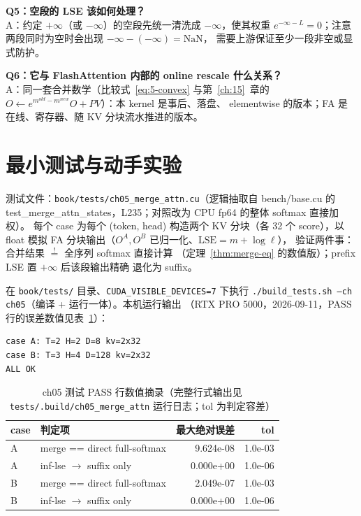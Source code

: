 \textbf{Q5：空段的 LSE 该如何处理？}\\
A：约定 $+\infty$（或 $-\infty$）的空段先统一清洗成 $-\infty$，使其权重
$e^{-\infty - L} = 0$；注意两段同时为空时会出现 $-\infty - (-\infty) = \mathrm{NaN}$，
需要上游保证至少一段非空或显式防护。

\textbf{Q6：它与 FlashAttention 内部的 online rescale 什么关系？}\\
A：同一套合并数学（比较式~\ref{eq:5-convex} 与第~\ref{ch:15}~章的
$O \leftarrow e^{m^{old} - m^{new}} O + PV$）：本 kernel 是事后、落盘、
elementwise 的版本；FA 是在线、寄存器、随 KV 分块流水推进的版本。

\section{最小测试与动手实验}

测试文件：\texttt{book/\allowbreak{}tests/\allowbreak{}ch05\_\allowbreak{}merge\_\allowbreak{}attn.cu}（逻辑抽取自 bench/base.cu 的
test\_merge\_attn\_states，L235；对照改为 CPU fp64 的整体 softmax 直接加权）。
每个 case 为每个 (token, head) 构造两个 KV 分块（各 32 个 score），以 float 模拟
FA 分块输出（$O^{A}, O^{B}$ 已归一化、$\mathrm{LSE} = m + \log \ell$），
验证两件事：合并结果 $\stackrel{!}{=}$ 全序列 softmax 直接计算
（定理~\ref{thm:merge-eq} 的数值版）；prefix LSE 置 $+\infty$ 后该段输出精确
退化为 suffix。

在 \texttt{book/tests/} 目录、\texttt{CUDA\_\allowbreak{}VISIBLE\_\allowbreak{}DEVICES=\allowbreak{}7} 下执行
\texttt{.\allowbreak{}/\allowbreak{}build\_\allowbreak{}tests.\allowbreak{}sh --ch ch05}（编译 + 运行一体）。本机运行输出
（RTX PRO 5000，2026-09-11，PASS 行的误差数值见表~\ref{tab:5-pass}）：

\begin{lstlisting}[style=console]
case A: T=2 H=2 D=8 kv=2x32
case B: T=3 H=4 D=128 kv=2x32
ALL OK
\end{lstlisting}

\begin{table}[htbp]
\centering
\caption{ch05 测试 PASS 行数值摘录（完整行式输出见
\texttt{tests/\allowbreak{}.build/\allowbreak{}ch05\_\allowbreak{}merge\_\allowbreak{}attn} 运行日志；tol 为判定容差）}
\label{tab:5-pass}
\begin{tabular}{llrr}
\toprule
case & 判定项 & 最大绝对误差 & tol \\
\midrule
A & merge == direct full-softmax & 9.624e-08 & 1.0e-03 \\
A & inf-lse $\to$ suffix only    & 0.000e+00 & 1.0e-06 \\
B & merge == direct full-softmax & 2.049e-07 & 1.0e-03 \\
B & inf-lse $\to$ suffix only    & 0.000e+00 & 1.0e-06 \\
\bottomrule
\end{tabular}
\end{table}

